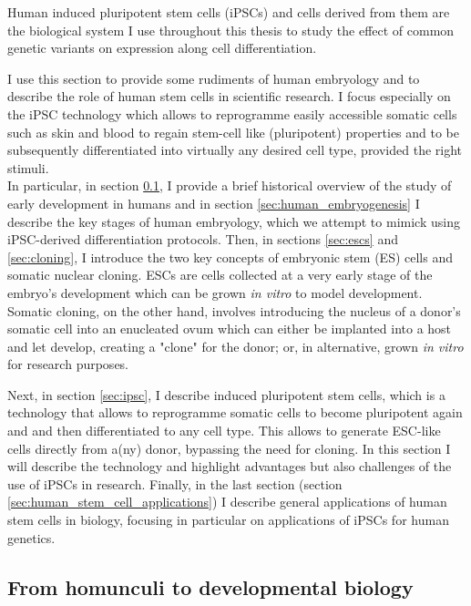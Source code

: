Human induced pluripotent stem cells (iPSCs) and cells derived from them are the biological system I use throughout this thesis to study the effect of common genetic variants on expression along cell differentiation.

I use this section to provide some rudiments of human embryology and to describe the role of human stem cells in scientific research.
I focus especially on the iPSC technology which allows to reprogramme easily accessible somatic cells such as skin and blood to regain stem-cell like (pluripotent) properties and to be subsequently differentiated into virtually any desired cell type, provided the right stimuli.\\

In particular, in section \ref{sec:history_developmental_biology}, I provide a brief historical overview of the study of early development in humans and in section \ref{sec:human_embryogenesis} I describe the key stages of human embryology, which we attempt to mimick using iPSC-derived differentiation protocols.
Then, in sections \ref{sec:escs} and \ref{sec:cloning}, I introduce the two key concepts of embryonic stem (ES) cells and somatic nuclear cloning.
ESCs are cells collected at a very early stage of the embryo's development which can be grown \textit{in vitro} to model development.
Somatic cloning, on the other hand, involves introducing the nucleus of a donor's somatic cell into an enucleated ovum which can either be implanted into a host and let develop, creating a "clone" for the donor; or, in alternative, grown \textit{in vitro} for research purposes.
 
Next, in section \ref{sec:ipsc}, I describe induced pluripotent stem cells, which is a technology that allows to reprogramme somatic cells to become pluripotent again and and then differentiated to any cell type. 
This allows to generate ESC-like cells directly from a(ny) donor, bypassing the need for cloning. 
In this section I will describe the technology and highlight advantages but also challenges of the use of iPSCs in research.
Finally, in the last section (section \ref{sec:human_stem_cell_applications}) I describe general applications of human stem cells in biology, focusing in particular on applications of iPSCs for human genetics.

\newpage

\subsection{From homunculi to developmental biology}
\label{sec:history_developmental_biology}

